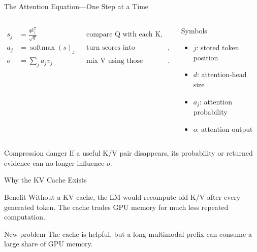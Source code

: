 \documentclass[aspectratio=169,10pt]{beamer}
\newcommand{\tightitems}{\setlength{\itemsep}{0.28em}\setlength{\parskip}{0pt}}
\begin{document}
\begin{frame}{The Attention Equation---One Step at a Time}
\small
\begin{columns}[T,onlytextwidth]
\begin{align*}
  s_j &= \frac{qk_j^{\mathsf T}}{\sqrt d}
  &&\text{compare Q with each K},\\[0.25em]
  a_j &= \operatorname{softmax}(s)_j
  &&\text{turn scores into probabilities},\\[0.25em]
  o &= \sum_j a_jv_j
  &&\text{mix V using those probabilities}.
\end{align*}
\begin{block}{Symbols}
\begin{itemize}\tightitems
  \item $j$: stored token position
  \item $d$: attention-head size
  \item $a_j$: attention probability
  \item $o$: attention output
\end{itemize}
\end{block}
\end{columns}
\begin{alertblock}{Compression danger}
If a useful K/V pair disappears, its probability or returned evidence can no longer influence $o$.
\end{alertblock}
\end{frame}

\begin{frame}{Why the KV Cache Exists}
\small
\begin{center}
\end{center}
\begin{block}{Benefit}
Without a KV cache, the LM would recompute old K/V after every generated token. The cache trades
GPU memory for much less repeated computation.
\end{block}
\begin{alertblock}{New problem}
The cache is helpful, but a long multimodal prefix can consume a large share of GPU memory.
\end{alertblock}
\end{frame}
\end{document}
